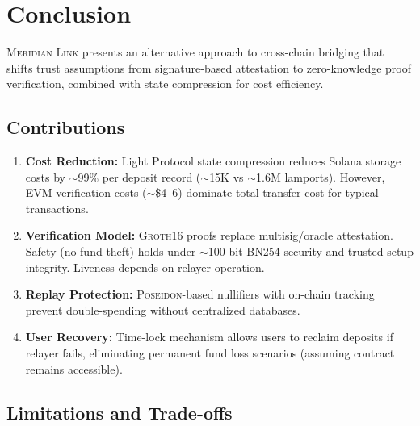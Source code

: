 \documentclass[11pt,a4paper,twoside]{article}
\newcommand{\protocol}{\textsc{Meridian Link}}
\newcommand{\poseidon}{\textsc{Poseidon}}
\newcommand{\groth}{\textsc{Groth16}}
\begin{document}
\section{Conclusion}
\label{sec:conclusion}

\protocol{} presents an alternative approach to cross-chain bridging that shifts trust assumptions from signature-based attestation to zero-knowledge proof verification, combined with state compression for cost efficiency.

\subsection{Contributions}

\begin{enumerate}
    \item \textbf{Cost Reduction:} Light Protocol state compression reduces Solana storage costs by $\sim$99\% per deposit record ($\sim$15K vs $\sim$1.6M lamports). However, EVM verification costs ($\sim$\$4--6) dominate total transfer cost for typical transactions.
    
    \item \textbf{Verification Model:} \groth{} proofs replace multisig/oracle attestation. Safety (no fund theft) holds under $\sim$100-bit BN254 security and trusted setup integrity. Liveness depends on relayer operation.
    
    \item \textbf{Replay Protection:} \poseidon{}-based nullifiers with on-chain tracking prevent double-spending without centralized databases.
    
    \item \textbf{User Recovery:} Time-lock mechanism allows users to reclaim deposits if relayer fails, eliminating permanent fund loss scenarios (assuming contract remains accessible).
\end{enumerate}

\subsection{Limitations and Trade-offs}
\end{document}
